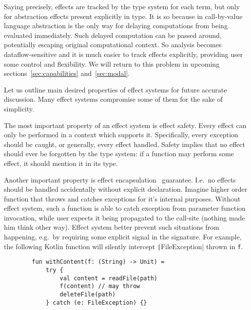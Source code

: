 \documentclass[conference]{IEEEtran}
\begin{document}
    Saying precisely, effects are tracked by the type system for each term, but only for abstraction effects present explicitly in type.
    It is so because in call-by-value language abstraction is the only way for delaying computations from being evaluated immediately.
    Such delayed computation can be passed around, potentially escaping original computational context.
    So analysis becomes dataflow-sensitive and it is much easier to track effects explicitly, providing user some control and flexibility.
    We will return to this problem in upcoming sections~\ref{sec:capabilities} and~\ref{sec:modal}.

    Let us outline main desired properties of effect systems for future accurate discussion.
    Many effect systems compromise some of them for the sake of simplicity.

    The most important property of an effect system is effect safety.
    Every effect can only be performed in a context which supports it.
    Specifically, every exception should be caught, or generally, every effect handled.
    Safety implies that no effect should ever be forgotten by the type system: if a function may perform some effect, it should mention it in its type.

    Another important property is effect encapsulation~\cite{lindley2018encapsulating} guarantee.
    I.e.\ no effects should be handled accidentally without explicit declaration.
    Imagine higher order function that throws and catches exceptions for it's internal purposes.
    Without effect system, such a function is able to catch exception from parameter function invocation, while user expects it being propagated to the call-site (nothing made him think other way).
    Effect system better prevent such situations from happening, e.g.\ by requiring some explicit signal in the signature.
    For example, the following Kotlin function will silently intercept \texttt|FileException| thrown in \texttt{f}.
    \begin{verbatim}
        fun withContent(f: (String) -> Unit) =
            try {
                val content = readFile(path)
                f(content) // may throw
                deleteFile(path)
            } catch (e: FileException) {}
    \end{verbatim}
\end{document}
